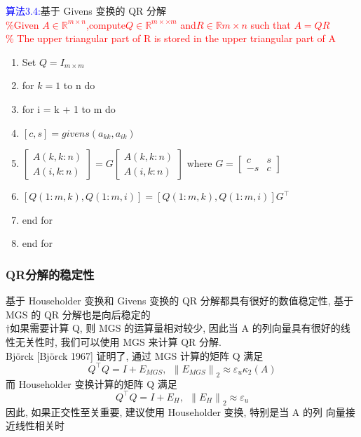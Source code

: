 \documentclass[12pt,a4paper]{article}
\begin{document}
\textcolor{blue}{算法3.4:}基于 Givens 变换的 QR 分解\\
\textcolor{red}{\%Given $A \in \mathbb{R}^{m\times n}$,compute$Q \in \mathbb{R}^{m×\times m}$ and$R\in \mathbb{R}{m\times n}$ such that $A = QR$\\
	\% The upper triangular part of R is stored in the upper triangular part of A}
\begin{enumerate}[1:]
	\item Set $Q=I_{m\times m}$
	\item for $k=1$ to n do
	\item \qquad for i = k + 1 to m do
	\item \qquad \qquad $[c, s]=givens(a_{kk}, a_{ik})$
	\item \qquad \qquad $\left[\begin{array}{c}{A(k, k : n)} \\ {A(i, k : n)}\end{array}\right]=G\left[\begin{array}{c}{A(k, k : n)} \\ {A(i, k : n)}\end{array}\right]$ where $G=\left[\begin{array}{cc}{c} & {s} \\ {-s} & {c}\end{array}\right]$
	\item \qquad \qquad $[Q(1 : m, k), Q(1 : m, i)]=[Q(1 : m, k), Q(1 : m, i)] G^{\top}$
	\item \qquad end for
	\item end for
\end{enumerate}
\subsubsection{QR分解的稳定性}
\noindent 基于 Householder 变换和 Givens 变换的 QR 分解都具有很好的数值稳定性, 基于 MGS 的 QR 分解也是向后稳定的\\
$\dagger$如果需要计算 Q, 则 MGS 的运算量相对较少, 因此当 A 的列向量具有很好的线性无关性时, 我们可以使用 MGS 来计算 QR 分解.\\
Björck [Björck 1967] 证明了, 通过 MGS 计算的矩阵 Q 满足
$$
Q^{\top} Q=I+E_{M G S},~~\left\|E_{M G S}\right\|_{2} \approx \varepsilon_{u} \kappa_{2}(A)
$$
而 Householder 变换计算的矩阵 Q 满足
$$
Q^{\top} Q=I+E_{H},~~\left\|E_{H}\right\|_{2} \approx \varepsilon_{u}
$$
因此, 如果正交性至关重要, 建议使用 Householder 变换, 特别是当 A 的列 向量接近线性相关时
\end{document}

